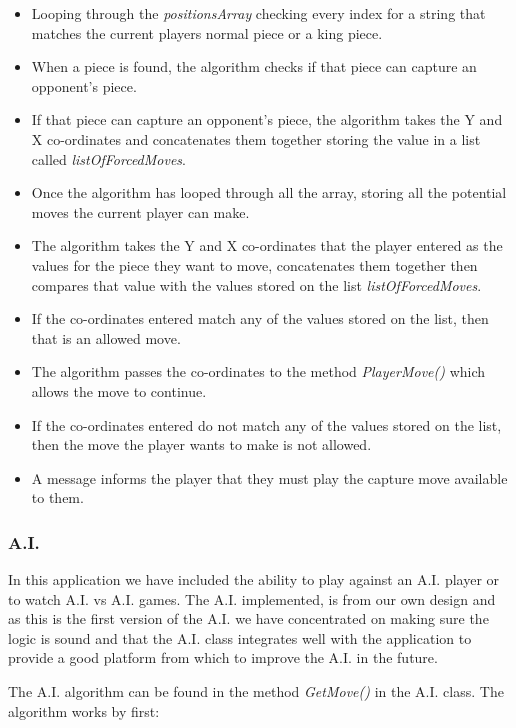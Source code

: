 \documentclass[10pt, a4paper]{article}
\begin{document}
    	\begin{itemize}
	   		\item Looping through the \textit{positionsArray} checking every index for a string that matches the current players normal piece or a king piece.
	    	\item When a piece is found, the algorithm checks if that piece can capture an opponent's piece.
	    	\item If that piece can capture an opponent's piece, the algorithm takes the Y and X co-ordinates and concatenates them together storing the value in a list called \textit{listOfForcedMoves}.
	    	\item Once the algorithm has looped through all the array, storing all the potential moves the current player can make.
	    	\item The algorithm takes the Y and X co-ordinates that the player entered as the values for the piece they want to move, concatenates them together then compares that value with the values stored on the list \textit{listOfForcedMoves}.
	    	\item If the co-ordinates entered match any of the values stored on the list, then that is an allowed move.
	    	\item The algorithm passes the co-ordinates to the method \textit{PlayerMove()} which allows the move to continue.
	    	\item If the co-ordinates entered do not match any of the values stored on the list, then the move the player wants to make is not allowed.
	    	\item A message informs the player that they must play the capture move available to them.
    	\end{itemize} 
    
    
    	\subsubsection{A.I.}    	
    
    	In this application we have included the ability to play against an A.I. player or to watch A.I. vs A.I. games. The A.I. implemented, is from our own design and as this is the first version of the A.I. we have concentrated on making sure the logic is sound and that the A.I. class integrates well with the application to provide a good platform from which to improve the A.I. in the future.
    	
    	The A.I. algorithm can be found in the method \textit{GetMove()} in the A.I. class. The algorithm works by first:  	
    	
\end{document}
